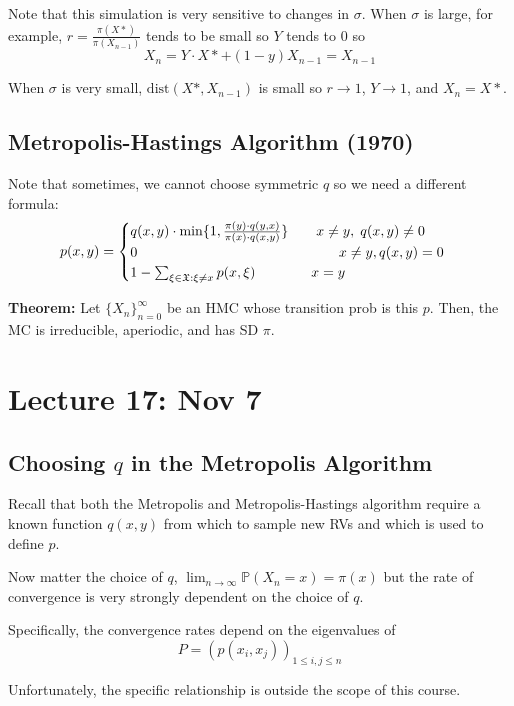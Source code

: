 \documentclass[12pt]{article}
\renewcommand{\P}{\mathbb{P}}
\newcommand{\mfX}{\mathfrak{X}}
\begin{document}
            Note that this simulation is very sensitive to changes in $\sigma$. When $\sigma$ is large, for example, $r = \frac{\pi(X*)}{\pi(X_{n-1})}$ tends to be small so $Y$ tends to $0$ so 
            \[X_n = Y\cdot X* + (1- y)X_{n-1} = X_{n-1}\]
            
            When $\sigma$ is very small, $\text{dist}(X*, X_{n-1})$ is small so $r \to 1$, $Y \to 1$, and $X_n = X*$. 

        \subsection{Metropolis-Hastings Algorithm (1970)}
            Note that sometimes, we cannot choose symmetric $q$ so we need a different formula: 
            \[p(x, y) = \begin{cases}
                q(x, y)\cdot \min\{1, \frac{\pi(y) \cdot q(y,x)}{\pi(x) \cdot q(x, y)}\} \qquad x\neq y, \; q(x, y) \neq 0\\
                0 \hspace*{2in} x\neq y, q(x, y) = 0\\
                1 - \sum_{\xi \in \mfX: \xi\neq x} p(x, \xi) \qquad \qquad x = y
            \end{cases}\]

            \textbf{Theorem:} Let $\{X_n\}_{n=0}^\infty$ be an HMC whose transition prob is this $p$. Then, the MC is irreducible, aperiodic, and has SD $\pi$.

\section{Lecture 17: Nov 7}
    \subsection{Choosing $q$ in the Metropolis Algorithm}  
        Recall that both the Metropolis and Metropolis-Hastings algorithm require a known function $q(x, y)$ from which to sample new RVs and which is used to define $p$. 
        
        Now matter the choice of $q$, $\lim_{n\to\infty} \P(X_n = x) = \pi(x)$ but the rate of convergence is very strongly dependent on the choice of $q$.

        Specifically, the convergence rates depend on the eigenvalues of 
        \[P = (p(x_i, x_j))_{1 \leq i, j \leq n}\]

        Unfortunately, the specific relationship is outside the scope of this course. 
\end{document}

